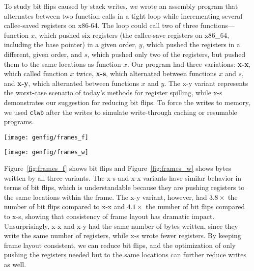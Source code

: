 To study bit flips caused by stack writes, we wrote an assembly program
that alternates between two function calls in a tight loop while incrementing
several callee-saved registers on x86-64. The loop could call two of three
functions---function $x$, which pushed six registers (the callee-save registers on x86\_64,
including the base pointer) in a given order, $y$,
which pushed the registers in a different, given order, and $s$, which pushed only
two of the registers, but pushed them to the same locations as function $x$.
Our program had three variations: \textbf{x-x}, which called function $x$ twice,
\textbf{x-s}, which alternated between functions $x$ and $s$, and \textbf{x-y},
which alternated between functions $x$ and $y$.  The x-y variant represents
the worst-case scenario of today's methods for register spilling, while x-s
demonstrates our suggestion for reducing bit flips. To force the writes to
memory, we used \texttt{clwb} after the writes to simulate write-through
caching or resumable programs.


\begin{SCfigure}
	\centering
	\texttt{[image: genfig/frames\_f]}
	\caption{Bits flipped by different stack frame layouts.}
	\label{fig:frames_f}
\end{SCfigure}

\begin{SCfigure}
	\centering
	\texttt{[image: genfig/frames\_w]}
	\caption{Bytes written by different stack frame layouts.}
	\label{fig:frames_w}
\end{SCfigure}


Figure~\ref{fig:frames_f} shows bit flips and Figure~\ref{fig:frames_w} shows bytes written by all
three variants. The x-s and x-x variants have similar behavior in terms of bit
flips, which is understandable because they are pushing registers to the same
locations within the frame. The x-y variant, however, had $3.8\times$ the number
of bit flips compared to x-x and $4.1\times$ the number of bit flips compared to x-s, showing that
consistency of frame layout has dramatic impact. Unsurprisingly, x-x and x-y had
the same number of bytes written, since they write the same number of
registers, while x-s wrote fewer registers. By keeping frame layout consistent,
we can reduce bit flips, and the optimization of only pushing the registers
needed but to the same locations can further reduce writes as well.

